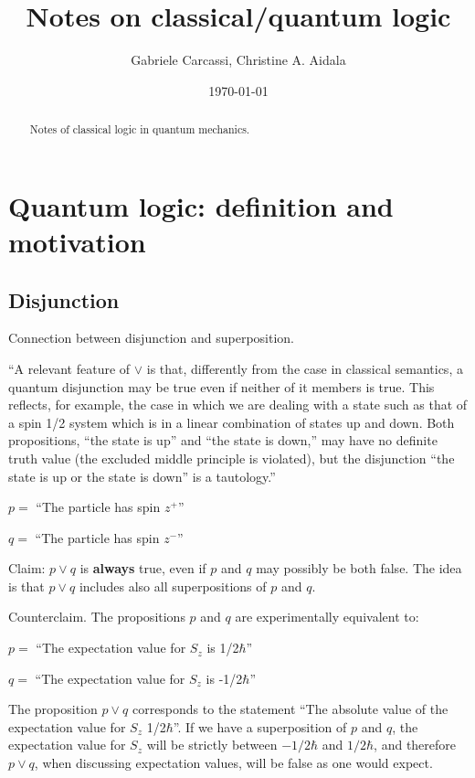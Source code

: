 \documentclass[10pt,twocolumn, nofootinbib]{revtex4-1}
\begin{document}
\title{Notes on classical/quantum logic }
\author{Gabriele Carcassi, Christine A. Aidala}

\date{\today}


\begin{abstract}
Notes of classical logic in quantum mechanics.
\end{abstract}

\maketitle

\section{Quantum logic: definition and motivation}

\subsection{Disjunction}

Connection between disjunction and superposition.

``A relevant feature of $\vee$ is that, differently from the case in classical semantics, a quantum disjunction may be true even if neither of it members is true. This reflects, for example, the case in which we are dealing with a state such as that of a spin 1/2 system which is in a linear combination of states up and down. Both propositions, ``the state is up'' and ``the state is down,'' may have no definite truth value (the excluded middle principle is violated), but the disjunction ``the state is up or the state is down'' is a tautology.''

\begin{description}
	\item $p =$ ``The particle has spin $z^+$''
	\item $q =$ ``The particle has spin $z^-$''
\end{description}

Claim: $p \vee q$ is \textbf{always} true, even if $p$ and $q$ may possibly be both false. The idea is that $p \vee q$ includes also all superpositions of $p$ and $q$.

Counterclaim. The propositions $p$ and $q$ are experimentally equivalent to:
\begin{description}
	\item $p =$ ``The expectation value for $S_z$ is 1/2$\hbar$''
	\item $q =$ ``The expectation value for $S_z$ is -1/2$\hbar$''
\end{description}
The proposition $p \vee q$ corresponds to the statement ``The absolute value of the expectation value for $S_z$ 1/2$\hbar$''. If we have a superposition of $p$ and $q$, the expectation value for $S_z$ will be strictly between $-1/2 \hbar$ and $1/2 \hbar$, and therefore $p \vee q$, when discussing expectation values, will be false as one would expect.
\end{document}
